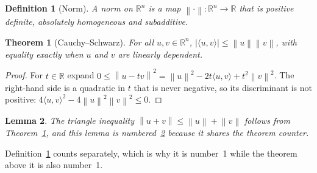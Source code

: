 \documentclass[11pt]{article}
\newcommand{\R}{\mathbb{R}}
\newcommand{\norm}[1]{\left\lVert #1 \right\rVert}
\newcommand{\inner}[2]{\langle #1, #2 \rangle}
\newtheorem{theorem}{Theorem}
\newtheorem{lemma}[theorem]{Lemma}
\newtheorem{definition}{Definition}
\begin{document}
\begin{definition}[Norm]\label{def:norm}
A norm on $\R^n$ is a map $\norm{\cdot} : \R^n \to \R$ that is positive
definite, absolutely homogeneous and subadditive.
\end{definition}

\begin{theorem}[Cauchy--Schwarz]\label{thm:cs}
For all $u, v \in \R^n$, $\left| \inner{u}{v} \right| \le \norm{u} \norm{v}$,
with equality exactly when $u$ and $v$ are linearly dependent.
\end{theorem}

\begin{proof}
For $t \in \R$ expand $0 \le \norm{u - t v}^2 = \norm{u}^2 - 2t \inner{u}{v}
+ t^2 \norm{v}^2$. The right-hand side is a quadratic in $t$ that is never
negative, so its discriminant is not positive:
$4 \inner{u}{v}^2 - 4 \norm{u}^2 \norm{v}^2 \le 0$.
\end{proof}

\begin{lemma}\label{lem:triangle}
The triangle inequality $\norm{u + v} \le \norm{u} + \norm{v}$ follows from
Theorem~\ref{thm:cs}, and this lemma is numbered~\ref{lem:triangle} because
it shares the theorem counter.
\end{lemma}

Definition~\ref{def:norm} counts separately, which is why it is number~1
while the theorem above it is also number~1.
\end{document}
